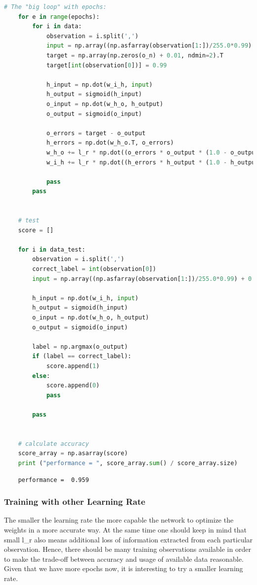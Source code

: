 \begin{lstlisting}[language=Python]   
    # The "big loop" with epochs:
    for e in range(epochs):
        for i in data:
            observation = i.split(',')
            input = np.array((np.asfarray(observation[1:])/255.0*0.99) + 0.01, ndmin=2).T
            target = np.array(np.zeros(o_n) + 0.01, ndmin=2).T
            target[int(observation[0])] = 0.99
    
            h_input = np.dot(w_i_h, input)
            h_output = sigmoid(h_input)
            o_input = np.dot(w_h_o, h_output)
            o_output = sigmoid(o_input)
    
            o_errors = target - o_output
            h_errors = np.dot(w_h_o.T, o_errors)
            w_h_o += l_r * np.dot((o_errors * o_output * (1.0 - o_output)), np.transpose(h_output))
            w_i_h += l_r * np.dot((h_errors * h_output * (1.0 - h_output)), np.transpose(input))
    
            pass
        pass
    
    
    # test
    score = []
    
    for i in data_test:
        observation = i.split(',')
        correct_label = int(observation[0])
        input = np.array((np.asfarray(observation[1:])/255.0*0.99) + 0.01, ndmin=2).T
    
        h_input = np.dot(w_i_h, input)
        h_output = sigmoid(h_input)
        o_input = np.dot(w_h_o, h_output)
        o_output = sigmoid(o_input)
    
        label = np.argmax(o_output)
        if (label == correct_label):
            score.append(1)
        else:
            score.append(0)
            pass
        
        pass
    
    
    # calculate accuracy
    score_array = np.asarray(score)
    print ("performance = ", score_array.sum() / score_array.size)
\end{lstlisting}

\begin{lstlisting}
    performance =  0.959
\end{lstlisting}


\subsubsection{Training with other Learning Rate}
   
The smaller the learning rate the more capable the network to optimize the weights in a more accurate way. At the same time one should keep in mind that small l\_r also means additional loss of information extracted from each particular observation. Hence, there should be many training observations available in order to make the trade-off between accuracy and usage of available data reasonable. Given that we have more epochs now, it is interesting to try a smaller learning rate.

